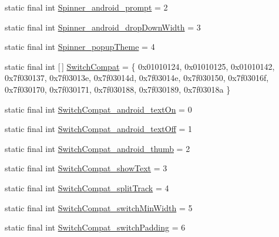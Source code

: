 \begin{DoxyCompactItemize}
\item 
static final int \mbox{\hyperlink{classandroid_1_1support_1_1v7_1_1appcompat_1_1R_1_1styleable_a2b020d064f01dd162a9186546be615ed}{Spinner\+\_\+android\+\_\+prompt}} = 2
\item 
static final int \mbox{\hyperlink{classandroid_1_1support_1_1v7_1_1appcompat_1_1R_1_1styleable_a636540870b1adf3ad212d48846883084}{Spinner\+\_\+android\+\_\+drop\+Down\+Width}} = 3
\item 
static final int \mbox{\hyperlink{classandroid_1_1support_1_1v7_1_1appcompat_1_1R_1_1styleable_ab9af518c5e821e5b40a299636324b4e2}{Spinner\+\_\+popup\+Theme}} = 4
\item 
static final int \mbox{[}$\,$\mbox{]} \mbox{\hyperlink{classandroid_1_1support_1_1v7_1_1appcompat_1_1R_1_1styleable_aabe688560752254f2288f3eaf9439737}{Switch\+Compat}} = \{ 0x01010124, 0x01010125, 0x01010142, 0x7f030137, 0x7f03013e, 0x7f03014d, 0x7f03014e, 0x7f030150, 0x7f03016f, 0x7f030170, 0x7f030171, 0x7f030188, 0x7f030189, 0x7f03018a \}
\item 
static final int \mbox{\hyperlink{classandroid_1_1support_1_1v7_1_1appcompat_1_1R_1_1styleable_a1d0fcc134e8b81cc9141e37b8246b242}{Switch\+Compat\+\_\+android\+\_\+text\+On}} = 0
\item 
static final int \mbox{\hyperlink{classandroid_1_1support_1_1v7_1_1appcompat_1_1R_1_1styleable_ad9b521772e16cac1f87dfe01701ec275}{Switch\+Compat\+\_\+android\+\_\+text\+Off}} = 1
\item 
static final int \mbox{\hyperlink{classandroid_1_1support_1_1v7_1_1appcompat_1_1R_1_1styleable_acff0cde8bd63f337d4c55e8666daa6a5}{Switch\+Compat\+\_\+android\+\_\+thumb}} = 2
\item 
static final int \mbox{\hyperlink{classandroid_1_1support_1_1v7_1_1appcompat_1_1R_1_1styleable_a4fd31aede69168c52edce7ec1e4bdaa3}{Switch\+Compat\+\_\+show\+Text}} = 3
\item 
static final int \mbox{\hyperlink{classandroid_1_1support_1_1v7_1_1appcompat_1_1R_1_1styleable_ac648c26d460574e0c534a588203c7cbd}{Switch\+Compat\+\_\+split\+Track}} = 4
\item 
static final int \mbox{\hyperlink{classandroid_1_1support_1_1v7_1_1appcompat_1_1R_1_1styleable_aef06639e58bb6eca40c6bed26125923c}{Switch\+Compat\+\_\+switch\+Min\+Width}} = 5
\item 
static final int \mbox{\hyperlink{classandroid_1_1support_1_1v7_1_1appcompat_1_1R_1_1styleable_ac57d47a51563c7a2ee853b214d664107}{Switch\+Compat\+\_\+switch\+Padding}} = 6
\item 

\end{DoxyCompactItemize}
